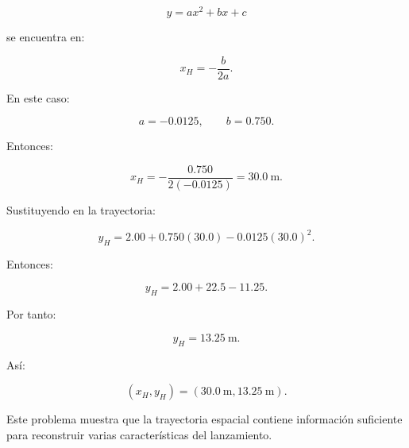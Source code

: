 \begin{explicacion}
\[
y=ax^2+bx+c
\]

se encuentra en:

\[
x_H
=
-\frac{b}{2a}.
\]

En este caso:

\[
a=-0.0125,
\qquad
b=0.750.
\]

Entonces:

\[
x_H
=
-\frac{0.750}{2(-0.0125)}
=
\boxed{\SI{30.0}{\meter}}.
\]

Sustituyendo en la trayectoria:

\[
y_H
=
2.00
+
0.750(30.0)
-
0.0125(30.0)^2.
\]

Entonces:

\[
y_H
=
2.00+22.5-11.25.
\]

Por tanto:

\[
\boxed{
y_H=\SI{13.25}{\meter}
}.
\]

Así:

\[
\boxed{
(x_H,y_H)
=
(\SI{30.0}{\meter},\SI{13.25}{\meter})
}.
\]

Este problema muestra que la trayectoria espacial contiene información suficiente
para reconstruir varias características del lanzamiento.
\end{explicacion}